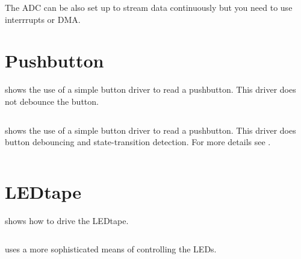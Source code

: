 The ADC can be also set up to stream data continuously but you need to
use interrrupts or DMA.


\section{Pushbutton}
\label{pushbutton}

 shows the use of a
simple button driver to read a pushbutton.  This driver does not debounce the button.

\inputminted{C}{../../src/test-apps/button_test1/button_test1.c}

 shows the use of a
simple button driver to read a pushbutton.  This driver does button
debouncing and state-transition detection.  For more details see
.

\inputminted{C}{../../src/test-apps/button_test2/button_test2.c}


\section{LEDtape}
\label{ledtape}

 shows how to drive the
LEDtape.

\inputminted{C}{../../src/test-apps/ledtape_test1/ledtape_test1.c}


 uses a more
sophisticated means of controlling the LEDs.

\inputminted{C}{../../src/test-apps/ledtape_test2/ledtape_test2.c}
